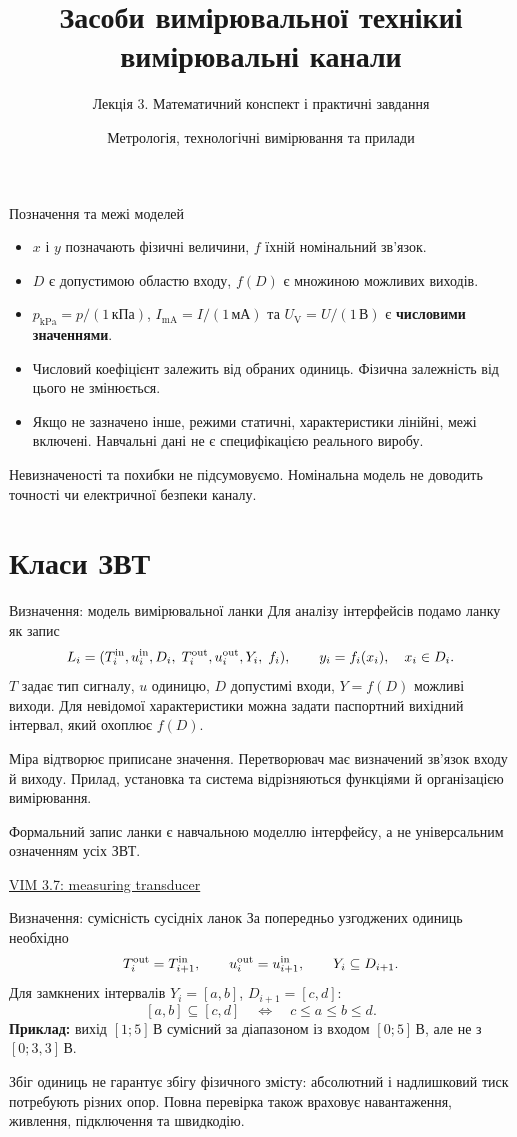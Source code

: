 \documentclass[aspectratio=169,11pt]{beamer}
\title{Засоби вимірювальної техніки\newline і вимірювальні канали}
\subtitle{Лекція 3. Математичний конспект і практичні завдання}
\author{Метрологія, технологічні вимірювання та прилади}
\date{}
\newcommand{\unit}[1]{\,\text{#1}}
\newcommand{\src}[2]{\par\vfill{\tiny\href{#1}{#2}}}
\begin{document}
\begin{frame}
\titlepage
\end{frame}

\begin{frame}{Позначення та межі моделей}
\begin{itemize}
\item $x$ і $y$ позначають фізичні величини, $f$ їхній номінальний зв'язок.
\item $D$ є допустимою областю входу, $f(D)$ є множиною можливих виходів.
\item $p_{\mathrm{kPa}}=p/(1\unit{кПа})$, $I_{\mathrm{mA}}=I/(1\unit{мА})$ та $U_{\mathrm V}=U/(1\unit{В})$ є \textbf{числовими значеннями}.
\item Числовий коефіцієнт залежить від обраних одиниць. Фізична залежність від цього не змінюється.
\item Якщо не зазначено інше, режими статичні, характеристики лінійні, межі включені. Навчальні дані не є специфікацією реального виробу.
\end{itemize}
Невизначеності та похибки не підсумовуємо. Номінальна модель не доводить точності чи електричної безпеки каналу.
\end{frame}

\section{Класи ЗВТ}
\begin{frame}{Визначення: модель вимірювальної ланки}
Для аналізу інтерфейсів подамо ланку як запис
\[
L_i=(T_i^{\rm in},u_i^{\rm in},D_i,\;T_i^{\rm out},u_i^{\rm out},Y_i,\;f_i),
\qquad y_i=f_i(x_i),\quad x_i\in D_i.
\]
$T$ задає тип сигналу, $u$ одиницю, $D$ допустимі входи, $Y=f(D)$ можливі виходи. Для невідомої характеристики можна задати паспортний вихідний інтервал, який охоплює $f(D)$.
\medskip

Міра відтворює приписане значення. Перетворювач має визначений зв'язок входу й виходу. Прилад, установка та система відрізняються функціями й організацією вимірювання.
\medskip

Формальний запис ланки є навчальною моделлю інтерфейсу, а не універсальним означенням усіх ЗВТ.
\src{https://jcgm.bipm.org/vim/en/3.7.html}{VIM 3.7: measuring transducer}
\end{frame}

\begin{frame}{Визначення: сумісність сусідніх ланок}
За попередньо узгоджених одиниць необхідно
\[
T_i^{\rm out}=T_{i+1}^{\rm in},\qquad
u_i^{\rm out}=u_{i+1}^{\rm in},\qquad Y_i\subseteq D_{i+1}.
\]
Для замкнених інтервалів $Y_i=[a,b]$, $D_{i+1}=[c,d]$:
\[
[a,b]\subseteq[c,d]\quad\Longleftrightarrow\quad c\le a\le b\le d.
\]
\textbf{Приклад:} вихід $[1;5]\unit{В}$ сумісний за діапазоном із входом $[0;5]\unit{В}$, але не з $[0;3{,}3]\unit{В}$.
\medskip

Збіг одиниць не гарантує збігу фізичного змісту: абсолютний і надлишковий тиск потребують різних опор. Повна перевірка також враховує навантаження, живлення, підключення та швидкодію.
\end{frame}
\end{document}

